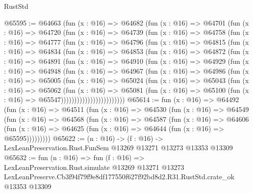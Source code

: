 \begin{lexlean}{RustStd}
\begin{coremodule}
@65595 := @64663
    (fun (x : @16) =>
    @64682
      (fun (x : @16) =>
      @64701
        (fun (x : @16) =>
        @64720
          (fun (x : @16) =>
          @64739
            (fun (x : @16) =>
            @64758
              (fun (x : @16) =>
              @64777
                (fun (x : @16) =>
                @64796
                  (fun (x : @16) =>
                  @64815
                    (fun (x : @16) =>
                    @64834
                      (fun (x : @16) =>
                      @64853
                        (fun (x : @16) =>
                        @64872
                          (fun (x : @16) =>
                          @64891
                            (fun (x : @16) =>
                            @64910
                              (fun (x : @16) =>
                              @64929
                                (fun (x : @16) =>
                                @64948
                                  (fun (x : @16) =>
                                  @64967
                                    (fun (x : @16) =>
                                    @64986
                                      (fun (x : @16) =>
                                      @65005
                                        (fun (x : @16) =>
                                        @65024
                                          (fun (x : @16) =>
                                          @65043
                                            (fun (x : @16) =>
                                            @65062
                                              (fun (x : @16) =>
                                              @65081
                                                (fun (x : @16) =>
                                                @65100
                                                  (fun (x : @16) => @65547))))))))))))))))))))))))
@65614 := fun (x : @16) =>
  @64492
    (fun (x : @16) =>
    @64511
      (fun (x : @16) =>
      @64530
        (fun (x : @16) =>
        @64549
          (fun (x : @16) =>
          @64568
            (fun (x : @16) =>
            @64587
              (fun (x : @16) =>
              @64606
                (fun (x : @16) => @64625 (fun (x : @16) => @64644 (fun (x : @16) => @65595)))))))))
@65622 := (n : @16) ->
  (f : @16) -> LexLeanPreservation.Rust.FunSem @13269 @13271 @13273 @13353 @13309
@65632 := fun (n : @16) =>
  fun (f : @16) =>
  LexLeanPreservation.Rust.simulate
    @13269
    @13271
    @13273
    LexLeanPreserve.Cb3f94f79f9e8df177550f627f92bd8d2.R31.RustStd.crate_ok
    @13353
    @13309
\end{coremodule}
\end{lexlean}
